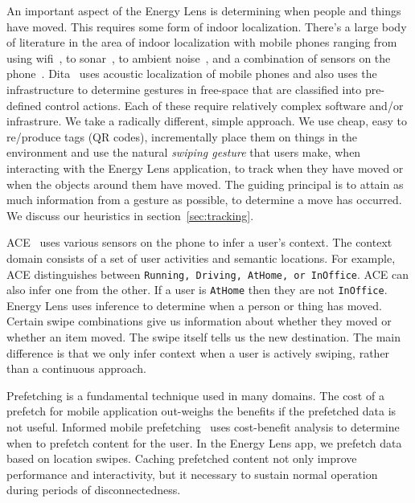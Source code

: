 An important aspect of the Energy Lens is determining when people and things have moved.  This requires some form 
of indoor localization.  There's a large body of literature in the area of indoor localization with mobile phones ranging from 
using wifi~\cite{radar}, to sonar~\cite{cricket}, to ambient noise~\cite{abs}, and a combination of sensors on the 
phone~\cite{surroundsense}.  Dita~\cite{dita} uses acoustic localization of mobile phones and also uses the infrastructure 
to determine gestures in free-space that are classified into pre-defined control actions.  Each of these require relatively complex 
software and/or infrastrure.  
We take a radically different, simple approach.  We use cheap, easy to re/produce tags (QR codes), incrementally place them on things in the 
environment and use the natural \emph{swiping gesture} that users make, when interacting with the Energy Lens 
application, to track when they have moved or when the objects around them have moved.  The guiding principal is to attain as much 
information from a gesture as possible, to determine a move has occurred.  We discuss our heuristics in section~\ref{sec:tracking}.

ACE~\cite{ACE} uses various sensors on the phone to infer a user's context.  The context domain consists of a set of user activities
and semantic locations.  For example, ACE distinguishes between {\tt Running, Driving, AtHome, or InOffice}.  ACE can also infer 
one from the other.  If a user is {\tt AtHome} then they are not {\tt InOffice}.  Energy Lens uses inference to determine
when a person or thing has moved.  Certain swipe combinations give us information about whether they moved or
whether an item moved.  The swipe itself tells us the new destination.  The main difference is that we only infer context 
when a user is actively swiping, rather
than a continuous approach.  

Prefetching is a fundamental technique used in many domains.  The cost of a prefetch for mobile
application out-weighs the benefits if the prefetched data is not useful.  Informed mobile prefetching~\cite{imp_mobisys2012} uses cost-benefit analysis 
to determine when to prefetch content for the user.  In the Energy Lens app, we prefetch data based on location swipes.
Caching prefetched content not only improve performance and interactivity, but it necessary to sustain normal
operation during periods of disconnectedness.

